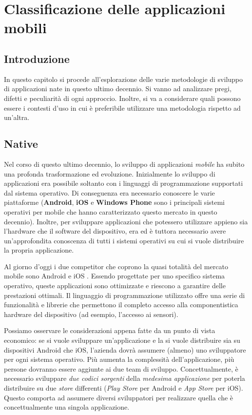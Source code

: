 \chapter{Classificazione delle applicazioni mobili}
\section{Introduzione}
In questo capitolo si procede all'esplorazione delle varie metodologie di sviluppo di applicazioni nate in questo ultimo decennio. Si vanno ad analizzare pregi, difetti e peculiarità di ogni approccio. Inoltre, si va a considerare quali possono essere i contesti d'uso in cui è preferibile utilizzare una metodologia rispetto ad un'altra.

\section{Native}
Nel corso di questo ultimo decennio, lo sviluppo di applicazioni \textit{mobile} ha subito una profonda trasformazione ed evoluzione. Inizialmente lo sviluppo di applicazioni era possibile soltanto con i linguaggi di programmazione supportati dal sistema operativo. Di conseguenza era necessario conoscere le varie piattaforme (\textbf{Android}, \textbf{iOS} e \textbf{Windows Phone} sono i principali sistemi operativi per mobile che hanno caratterizzato questo mercato in questo decennio). Inoltre, per sviluppare applicazioni che potessero utilizzare appieno sia l'hardware che il software del dispositivo, era ed è tuttora necessario avere un'approfondita conoscenza di tutti i sistemi operativi su cui si vuole distribuire la propria applicazione. 

Al giorno d'oggi i due competitor che coprono la quasi totalità del mercato mobile sono Android e iOS \cite{statistiche_os_mobile}. Essendo progettate per uno specifico sistema operativo, queste applicazioni sono ottimizzate e riescono a garantire delle prestazioni ottimali. Il linguaggio di programmazione utilizzato offre una serie di funzionalità e librerie che permettono il completo accesso alla componentistica hardware del dispositivo (ad esempio, l'accesso ai sensori).

Possiamo osservare le considerazioni appena fatte da un punto di vista economico: se si vuole sviluppare un'applicazione e la si vuole distribuire sia su dispositivi Android che iOS, l'azienda dovrà assumere (almeno) uno sviluppatore per ogni sistema operativo. Più aumenta la complessità dell'applicazione, più persone dovranno essere aggiunte ai due team di sviluppo. Concettualmente, è necessario sviluppare \textit{due codici sorgenti} della \textit{medesima applicazione} per poterla distribuire su due \textit{store} differenti (\textit{Play Store} per Android e \textit{App Store} per iOS). Questo comporta ad assumere diversi sviluppatori per realizzare quella che è concettualmente una singola applicazione.

